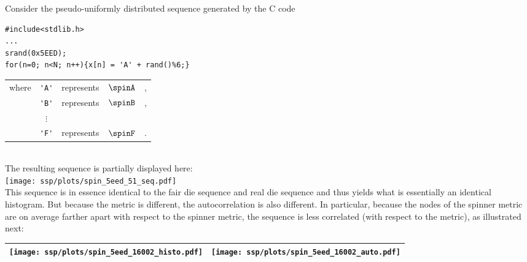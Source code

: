 \begin{example}
\label{ex:spinner_sha}
Consider the pseudo-uniformly distributed   
sequence generated by the C code\footnotemark 
%
\\\begin{minipage}{85mm}%
\begin{lstlisting}
#include<stdlib.h>
...
srand(0x5EED);
for(n=0; n<N; n++){x[n] = 'A' + rand()%6;}
\end{lstlisting}
\end{minipage}%
\hspace{10mm}%
\begin{tabular}{lclcl}
  where & \lstinline!'A'! &represents& $\spinA$ &,
     \\ & \lstinline!'B'! &represents& $\spinB$ &,
     \\ & $\vdots$
     \\ & \lstinline!'F'! &represents& $\spinF$ &.
\end{tabular}
\\
The resulting sequence is partially displayed here:
   \\\texttt{[image: ssp/plots/spin\_5eed\_51\_seq.pdf]}\\
This sequence is in essence identical to the fair die sequence  and real die sequence 
and thus yields what is essentially an identical histogram.
But because the metric is different, the autocorrelation  is also different.
In particular, because the nodes of the spinner metric are on average farther apart with respect to the spinner metric,
the sequence is less correlated (with respect to the metric), as illustrated next:
\\\begin{tabular}{|>{\scs}c|>{\scs}c|}
     \hline
     \texttt{[image: ssp/plots/spin\_5eed\_16002\_histo.pdf]}%
    &\texttt{[image: ssp/plots/spin\_5eed\_16002\_auto.pdf]}
   \\\hline
\end{tabular}
\end{example}


